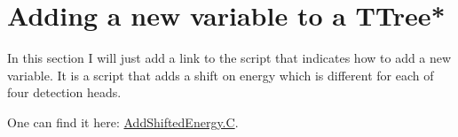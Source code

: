 \documentclass[12pt]{article}
\begin{document}
\section{Adding a new variable to a TTree*}
In this section I will just add a link to the script that indicates how to add a new variable. It is a script that adds a shift on energy which is different for each of four detection heads. 

One can find it here:   \href{https://github.com/kochebina/ROOT_manual_for_Gate_users/blob/master/Materials/AddShiftedEnergy.C}{AddShiftedEnergy.C}. 






%
%
\end{document}
